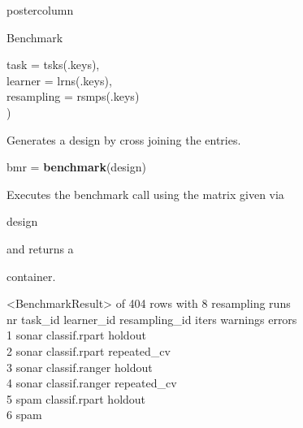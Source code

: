 \documentclass{beamer}
\newcommand{\codeinline}[1]{\begin{codeboxinline}#1\end{codeboxinline}}
\begin{document}
\begin{withoutheader}
\begin{frame}[fragile]{}
\begin{columns}
\begin{column}{.245\textwidth}
\begin{beamercolorbox}[center]{postercolumn}
\begin{minipage}{.98\textwidth}
{\begin{myblock}{Benchmark}
\begin{codeboxmultiline}[width=21.95cm]
							\hspace*{1ex}task = tsks(.keys),\\
							\hspace*{1ex}learner = lrns(.keys),\\
							\hspace*{1ex}resampling = rsmps(.keys)\\
							)
						\end{codeboxmultiline}
						Generates a design by cross joining the entries.
						\begin{codebox}
							bmr = \textbf{benchmark}(design)
						\end{codebox}
						Executes the benchmark call
						using the matrix given via \codeinline{design} and
						returns a \codeinline{}
						container.\\
						\begin{codeboxmultiline}[width=27cm]
							\scriptsize{
								<BenchmarkResult> of 404 rows with 8 resampling runs\\
								nr task\_id \space\space\space\space learner\_id resampling\_id iters warnings errors\\
								1 \space\space\space sonar \space classif.rpart
								\space\space\space\space\space\space holdout
								\space\space\space\space 1
								\space\space\space\space\space\space\space 0
								\space\space\space\space\space 0\\
								2 \space\space\space sonar \space classif.rpart
								\space\space repeated\_cv
								\space{}00
								\space\space\space\space\space\space{}
								\space\space\space\space{}\\
								3 \space\space\space sonar classif.ranger
								\space\space\space\space\space\space holdout
								\space\space\space\space 1
								\space\space\space\space\space\space\space 0
								\space\space\space\space\space 0\\
								4 \space\space\space sonar classif.ranger
								\space\space repeated\_cv
								\space{}
								\space\space\space\space\space\space{}
								\space\space\space\space{}\\
								5 \space\space\space\space spam
								\space classif.rpart
								\space\space\space\space\space\space holdout
								\space\space\space{}
								\space\space\space\space\space\space{}
								\space\space\space\space{}\\
								6 \space\space\space\space spam
}
\end{codeboxmultiline}
\end{myblock}}
\end{minipage}
\end{beamercolorbox}
\end{column}
\end{columns}
\end{frame}
\end{withoutheader}
\end{document}
